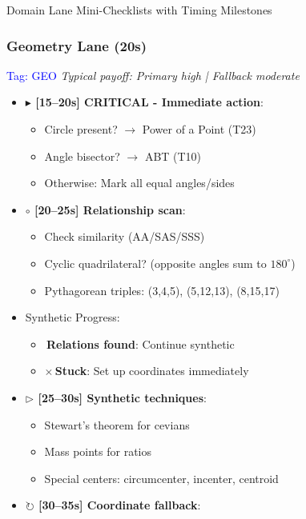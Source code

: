 \documentclass{article}
\begin{document}
\begin{classifybox}{Domain Lane Mini-Checklists with Timing Milestones}
     \subsubsection{Geometry Lane (20s)}
     {\footnotesize\textcolor{timegreen}{}}\quad\textcolor{blue}{Tag: GEO}
      \textit{Typical payoff: Primary high | Fallback moderate}
      \begin{itemize}[nosep]
      \item \textbf{$\blacktriangleright$ [15--20s] CRITICAL - Immediate action}:
        \begin{itemize}[nosep]
        \item Circle present? $\rightarrow$ Power of a Point (T23)
        \item Angle bisector? $\rightarrow$ ABT (T10)
        \item Otherwise: Mark all equal angles/sides
        \end{itemize}
      \item \textbf{$\circ$ [20--25s] Relationship scan}:
        \begin{itemize}[nosep]
        \item Check similarity (AA/SAS/SSS)
        \item Cyclic quadrilateral? (opposite angles sum to $180^\circ$)
        \item Pythagorean triples: (3,4,5), (5,12,13), (8,15,17)
        \end{itemize}
      \item {} Synthetic Progress:
        \begin{itemize}[nosep]
        \item \checkmark\,\textbf{Relations found}: Continue synthetic
        \item $\times$\,\textbf{Stuck}: Set up coordinates immediately
        \end{itemize}
      \item \textbf{$\triangleright$ [25--30s] Synthetic techniques}:
        \begin{itemize}[nosep]
        \item Stewart's theorem for cevians
        \item Mass points for ratios
        \item Special centers: circumcenter, incenter, centroid
        \end{itemize}
      \item \textbf{$\circlearrowright$ [30--35s] Coordinate fallback}:

\end{itemize}
\end{classifybox}
\end{document}
